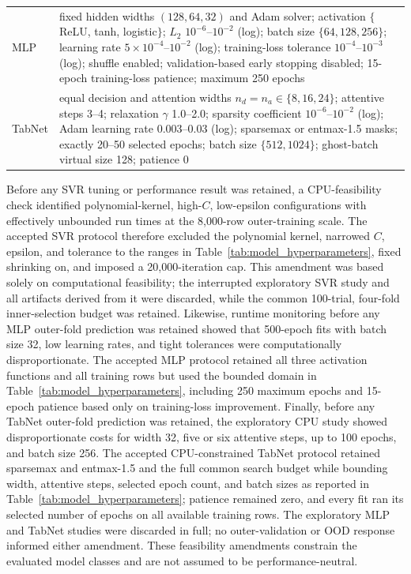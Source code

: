 \documentclass[a4paper,fleqn]{cas-sc}
\begin{document}
\begin{table}[htbp]
\begin{tabular}{p{2.0cm}p{8.7cm}}
MLP & fixed hidden widths $(128,64,32)$ and Adam solver; activation $\{$ReLU, tanh, logistic$\}$; $L_2$ $10^{-6}$--$10^{-2}$ (log); batch size $\{64,128,256\}$; learning rate $5\times10^{-4}$--$10^{-2}$ (log); training-loss tolerance $10^{-4}$--$10^{-3}$ (log); shuffle enabled; validation-based early stopping disabled; 15-epoch training-loss patience; maximum 250 epochs \\
TabNet & equal decision and attention widths $n_d=n_a\in\{8,16,24\}$; attentive steps 3--4; relaxation $\gamma$ 1.0--2.0; sparsity coefficient $10^{-6}$--$10^{-2}$ (log); Adam learning rate 0.003--0.03 (log); sparsemax or entmax-1.5 masks; exactly 20--50 selected epochs; batch size $\{512,1024\}$; ghost-batch virtual size 128; patience 0 \\

\hline
\end{tabular}
\end{table}

Before any SVR tuning or performance result was retained, a CPU-feasibility check identified polynomial-kernel, high-$C$, low-epsilon configurations with effectively unbounded run times at the 8,000-row outer-training scale. The accepted SVR protocol therefore excluded the polynomial kernel, narrowed $C$, epsilon, and tolerance to the ranges in Table~\ref{tab:model_hyperparameters}, fixed shrinking on, and imposed a 20,000-iteration cap. This amendment was based solely on computational feasibility; the interrupted exploratory SVR study and all artifacts derived from it were discarded, while the common 100-trial, four-fold inner-selection budget was retained. Likewise, runtime monitoring before any MLP outer-fold prediction was retained showed that 500-epoch fits with batch size 32, low learning rates, and tight tolerances were computationally disproportionate. The accepted MLP protocol retained all three activation functions and all training rows but used the bounded domain in Table~\ref{tab:model_hyperparameters}, including 250 maximum epochs and 15-epoch patience based only on training-loss improvement. Finally, before any TabNet outer-fold prediction was retained, the exploratory CPU study showed disproportionate costs for width 32, five or six attentive steps, up to 100 epochs, and batch size 256. The accepted CPU-constrained TabNet protocol retained sparsemax and entmax-1.5 and the full common search budget while bounding width, attentive steps, selected epoch count, and batch sizes as reported in Table~\ref{tab:model_hyperparameters}; patience remained zero, and every fit ran its selected number of epochs on all available training rows. The exploratory MLP and TabNet studies were discarded in full; no outer-validation or OOD response informed either amendment. These feasibility amendments constrain the evaluated model classes and are not assumed to be performance-neutral.
\end{document}
